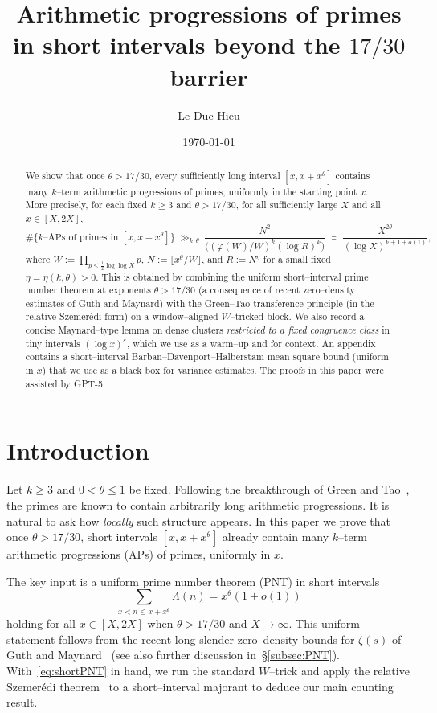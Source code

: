 \documentclass[11pt]{amsart}
\title[APs of primes in short intervals beyond the $17/30$ barrier]{Arithmetic progressions of primes in short intervals beyond the $17/30$ barrier}
\author{Le Duc Hieu}
\date{\today}
\theoremstyle{definition}
\theoremstyle{remark}
\numberwithin{equation}{section}
\begin{document}
\begin{abstract}
We show that once $\theta>17/30$, every sufficiently long interval $[x,x+x^\theta]$ contains many $k$--term arithmetic progressions of primes, uniformly in the starting point $x$. More precisely, for each fixed $k\ge3$ and $\theta>17/30$, for all sufficiently large $X$ and all $x\in[X,2X]$,
\[
\#\{\text{$k$--APs of primes in }[x,x+x^\theta]\}\ \gg_{k,\theta}\ \frac{N^{2}}{\big((\varphi(W)/W)^{k}(\log R)^{k}\big)}\ \asymp\ \frac{X^{2\theta}}{(\log X)^{k+1+o(1)}},
\]
where $W:=\prod_{p\le \tfrac12\log\log X}p$, $N:=\lfloor x^\theta/W\rfloor$, and $R:=N^\eta$ for a small fixed $\eta=\eta(k,\theta)>0$. This is obtained by combining the uniform short--interval prime number theorem at exponents $\theta>17/30$ (a consequence of recent zero--density estimates of Guth and Maynard) with the Green--Tao transference principle (in the relative Szemerédi form) on a window--aligned $W$--tricked block. We also record a concise Maynard--type lemma on dense clusters \emph{restricted to a fixed congruence class} in tiny intervals $(\log x)^\varepsilon$, which we use as a warm--up and for context. An appendix contains a short--interval Barban--Davenport--Halberstam mean square bound (uniform in $x$) that we use as a black box for variance estimates. The proofs in this paper were assisted by GPT-5.
\end{abstract}

\maketitle

\section{Introduction}
Let $k\ge3$ and $0<\theta\le 1$ be fixed. Following the breakthrough of Green and Tao~\cite{GreenTao08}, the primes are known to contain arbitrarily long arithmetic progressions. It is natural to ask how \emph{locally} such structure appears. In this paper we prove that once $\theta>17/30$, short intervals $[x,x+x^\theta]$ already contain many $k$--term arithmetic progressions (APs) of primes, uniformly in $x$.

The key input is a uniform prime number theorem (PNT) in short intervals
\begin{equation}\label{eq:shortPNT}
\sum_{x<n\le x+x^\theta}\Lambda(n)=x^\theta(1+o(1))
\end{equation}
holding for all $x\in[X,2X]$ when $\theta>17/30$ and $X\to\infty$.
This uniform statement follows from the recent long slender zero--density bounds for $\zeta(s)$ of Guth and Maynard~\cite{GuthMaynardAnnals,GuthMaynardArxiv} (see also further discussion in~\S\ref{subsec:PNT}).
With~\eqref{eq:shortPNT} in hand, we run the standard $W$--trick and apply the relative Szemerédi theorem~\cite{CFZ13,GreenTao08} to a short--interval majorant to deduce our main counting result.
\end{document}

